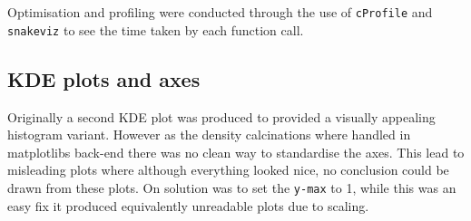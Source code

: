 \documentclass[bigger]{beamer}
\begin{document}
Optimisation and profiling were conducted through the use of \texttt{cProfile} and \texttt{snakeviz} to see the time taken by each function call.
\subsection{KDE plots and axes}
\label{sec:orgb4d4c9a}
Originally a second KDE plot was produced to provided a visually appealing histogram variant. However as the density calcinations where handled in matplotlibs back-end there was no clean way to standardise the axes. This lead to misleading plots where although everything looked nice, no conclusion could be drawn from these plots. On solution was to set the \texttt{y-max} to 1, while this was an easy fix it produced equivalently unreadable plots due to scaling.
\newpage
\end{document}
